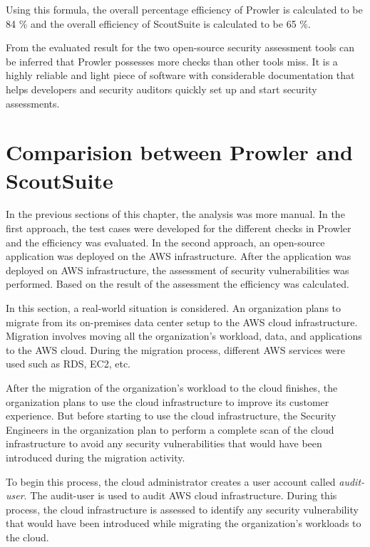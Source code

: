 Using this formula, the overall percentage efficiency of Prowler is calculated to be 84 \% and the overall efficiency of ScoutSuite is calculated to be 65 \%.

\par From the evaluated result for the two open-source security assessment tools can be inferred that Prowler possesses more checks than other tools miss.
It is a highly reliable and light piece of software with considerable documentation that helps developers and security auditors quickly set up and start security assessments.

\section{Comparision between Prowler and ScoutSuite}

\par In the previous sections of this chapter, the analysis was more manual.
In the first approach, the test cases were developed for the different checks in Prowler and the efficiency was evaluated.
In the second approach, an open-source application was
deployed
on the AWS infrastructure.
After the application
was deployed on AWS infrastructure, the assessment of
security vulnerabilities was performed.
Based on the result of the assessment the efficiency was calculated.
\\
\par In this section, a real-world situation is considered.
An organization plans to migrate from its on-premises data center setup to the AWS cloud infrastructure.
Migration involves moving all the organization’s workload, data, and applications to the AWS cloud.
During the migration process, different AWS services were
used such as RDS, EC2, etc.
\\
\par After the migration of the organization’s workload to the cloud finishes, the organization plans to use the cloud infrastructure to improve its customer experience.
But before starting to use the cloud infrastructure, the Security Engineers in the organization plan to perform a complete scan of the cloud infrastructure to avoid any security vulnerabilities that would have been introduced during the migration activity.
\\
\par To begin this process, the cloud administrator creates a user account called \textit{audit-user}.
The audit-user is used to audit AWS cloud infrastructure.
During this process, the cloud infrastructure is assessed to identify any security vulnerability that would have been introduced while migrating the organization’s workloads to the cloud.
